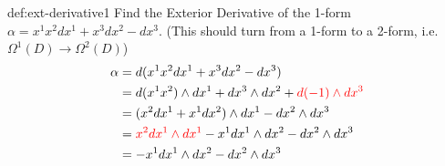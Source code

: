 \documentclass[landscape, 8pt]{extarticle}
\begin{document}
\begin{multicols}{3}
\begin{xmp}{def:ext-derivative}{1}
Find the Exterior Derivative of the 1-form \(\alpha = x^{1}x^{2}dx^{1} + x^{3}dx^{2} - dx^{3}\). (This should turn from a 1-form to a 2-form, i.e. \(\Omega^{1}(D)\to \Omega^{2}(D)\))
\begin{align*}
    \alpha &= d(x^{1}x^{2}dx^{1} + x^{3}dx^{2} - dx^{3}) \\ 
    &= d(x^{1}x^{2})\wedge dx^{1} + dx^{3}\wedge dx^{2} + \textcolor{red}{d(-1)\wedge dx^{3}} \\
    &= (x^{2}dx^{1} + x^{1}dx^{2}) \wedge dx^{1} - dx^{2}\wedge dx^{3} \\
    &= \textcolor{red}{x^{2}dx^{1}\wedge dx^{1}}-x^{1}dx^{1}\wedge dx^{2} - dx^{2} \wedge dx^{3} \\
    &= -x^{1}dx^{1}\wedge dx^{2} - dx^{2} \wedge dx^{3} 
\end{align*}

\end{xmp}


\end{multicols}
\end{document}
